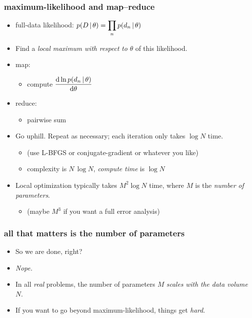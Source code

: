 \documentclass[pdftex]{beamer}
\begin{document}
\begin{frame}
  \frametitle{maximum-likelihood and map--reduce}
  \begin{itemize}
  \item full-data likelihood: $\displaystyle p(D\,|\,\theta) =
    \prod_n p(d_n\,|\,\theta)$
  \item Find a \emph{local maximum with respect to $\theta$} of this
    likelihood.
  \item map:
    \begin{itemize}
    \item compute $\displaystyle\frac{\mathrm{d} \ln p(d_n\,|\,\theta)}{\mathrm{d}\theta}$
    \end{itemize}
  \item reduce:
    \begin{itemize}
    \item pairwise sum
    \end{itemize}
  \item Go uphill.  Repeat as necessary; each iteration only takes
    $\log N$ time.
    \begin{itemize}
    \item (use L-BFGS or conjugate-gradient or whatever you like)
    \item complexity is $N\,\log N$, \emph{compute time} is $\log N$
    \end{itemize}
  \item Local optimization typically takes $M^2\log N$ time, where $M$ is the \emph{number of parameters}.
    \begin{itemize}
    \item (maybe $M^3$ if you want a full error analysis)
    \end{itemize}
  \end{itemize}
\end{frame}

\begin{frame}
  \frametitle{all that matters is the number of parameters}
  \begin{itemize}
  \item So we are done, right?
  \item<2-> \emph{Nope.}
  \item<3-> In all \emph{real} problems, the number of parameters $M$ \emph{scales with the data volume $N$}.
  \item<3-> If you want to go beyond maximum-likelihood, things get \emph{hard}.
  \end{itemize}
\end{frame}
\end{document}
